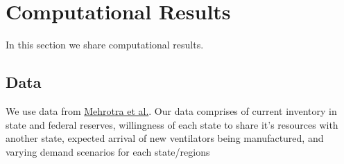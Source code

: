\documentclass[11pt,letterpaper]{article}
\begin{document}
\section{Computational Results}
In this section we share computational results.
\subsection{Data}
We use data from \href{https://pubsonline.informs.org/doi/pdf/10.1287/trsc.2017.0777}{Mehrotra et al.}. Our data comprises of current inventory in state and federal reserves, willingness of each state to share it's resources with another state, expected arrival of new ventilators being manufactured, and varying demand scenarios for each state/regions

\begin{comment}

\section{Not in report}
Anything after this point is old material. Copy paste from below and structure the report properly.
 \section*{Meeting with Jim on April 10}
factor in the travel time and when will be they available.Keeping track of how long have been they in use. Try SDDP maybe if demands are iid (Might be challenging). Clustering by regions maybe to reduce the size of the problem. For SDDP, d(t)=d(history)+some error function-auto regressive model. Error has some dependency. Mail challenge is figuring out how to fit the demand variable in SDDP framework. Scenario tree model not good enough because of too many states.
Markov chain might be a good approximation for keeping track of number of infections. Growth rate can depend on time (in a deterministic manner). Julia SDDP has some implemented algorithms. Comparison of different approaches, need a simulation to compare (beyomd the scope of the project). Implementing one algorithm might be enough. Goal should be to minimize the unmet demand (expected value or some risk measures)



\subsection*{Proposed Theme}
Stochastic Programming Approach to Temporal Resource Allocation for COVID-19 Pandemic.


\end{comment}
\end{document}
